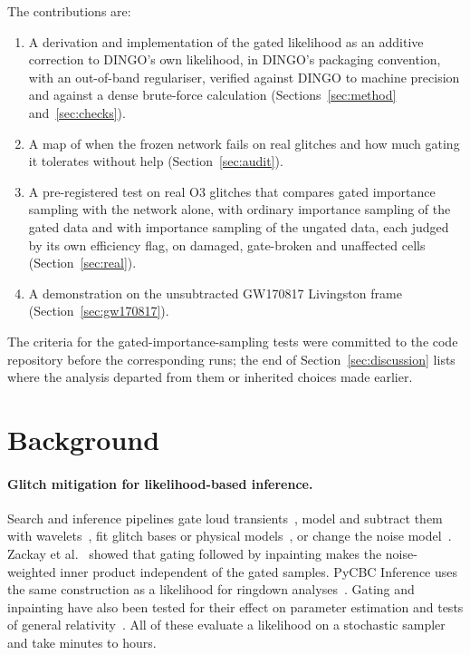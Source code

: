 \documentclass{openjournal}
\begin{document}
The contributions are:
\begin{enumerate}
\item A derivation and implementation of the gated likelihood as an additive correction to DINGO's own likelihood, in DINGO's packaging convention, with an out-of-band regulariser, verified against DINGO to machine precision and against a dense brute-force calculation (Sections~\ref{sec:method} and~\ref{sec:checks}).
\item A map of when the frozen network fails on real glitches and how much gating it tolerates without help (Section~\ref{sec:audit}).
\item A pre-registered test on real O3 glitches that compares gated importance sampling with the network alone, with ordinary importance sampling of the gated data and with importance sampling of the ungated data, each judged by its own efficiency flag, on damaged, gate-broken and unaffected cells (Section~\ref{sec:real}).
\item A demonstration on the unsubtracted GW170817 Livingston frame (Section~\ref{sec:gw170817}).
\end{enumerate}
The criteria for the gated-importance-sampling tests were committed to the code repository before the corresponding runs; the end of Section~\ref{sec:discussion} lists where the analysis departed from them or inherited choices made earlier.

\section{Background}
\label{sec:background}

\paragraph{Glitch mitigation for likelihood-based inference.}
Search and inference pipelines gate loud transients~\cite{Usman2016pycbc,Zackay2021nongaussian,Ewing2024gstlal}, model and subtract them with wavelets~\cite{Cornish2015bayeswave,Cornish2021bayeswave,Pankow2018mitigation,Hourihane2022overlap,Davis2022subtract,Ghonge2024efficacy}, fit glitch bases or physical models~\cite{Merritt2021glitschen,Udall2023scattered,Malz2025joint}, or change the noise model~\cite{Ashton2023gp,Legin2025score}.
Zackay et al.~\cite{Zackay2021nongaussian} showed that gating followed by inpainting makes the noise-weighted inner product independent of the gated samples.
PyCBC Inference uses the same construction as a likelihood for ringdown analyses~\cite{Capano2023multimode,Wang2025gating}.
Gating and inpainting have also been tested for their effect on parameter estimation and tests of general relativity~\cite{Kwok2022glitchgr,Pankow2018mitigation}.
All of these evaluate a likelihood on a stochastic sampler and take minutes to hours.
\end{document}
